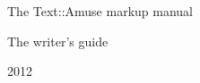 \documentclass[DIV=12,%
               BCOR=0mm,%
               fontsize=10pt,%
               oneside,%
               paper=210mm:11in]{scrbook}
\begin{document}
\clearpage

\thispagestyle{empty}

\begin{center}





\strut

\end{center}


\strut


\vfill

\begin{center}



The Text::Amuse markup manual

The writer's guide

2012

\bigskip








\end{center}
\end{document}
